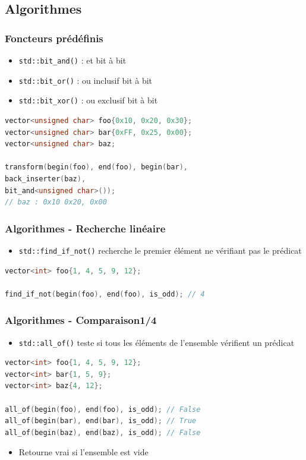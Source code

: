 \documentclass[C++.tex]{subfiles}
\begin{document}
\subsection*{Algorithmes}
\begin{frame}[fragile]
	\frametitle{Foncteurs prédéfinis}
	\begin{itemize}
		\item \lstinline|std::bit_and()| : et bit à bit
		\item \lstinline|std::bit_or()| : ou inclusif bit à bit
		\item \lstinline|std::bit_xor()| : ou exclusif bit à bit
	\end{itemize}

	\begin{lstlisting}[language=C++]
vector<unsigned char> foo{0x10, 0x20, 0x30};
vector<unsigned char> bar{0xFF, 0x25, 0x00};
vector<unsigned char> baz;

transform(begin(foo), end(foo), begin(bar), 
back_inserter(baz), 
bit_and<unsigned char>());
// baz : 0x10 0x20, 0x00\end{lstlisting}
\end{frame}

\begin{frame}[fragile]
	\frametitle{Algorithmes - Recherche linéaire}
	\begin{itemize}
		\item \lstinline|std::find_if_not()| recherche le premier élément ne vérifiant pas le prédicat
	\end{itemize}

	\begin{lstlisting}[language=C++]
vector<int> foo{1, 4, 5, 9, 12};

find_if_not(begin(foo), end(foo), is_odd); // 4\end{lstlisting}

\end{frame}

\begin{frame}[fragile]
	\frametitle{Algorithmes - Comparaison\titlehfill{}1/4}
	\begin{itemize}
		\item \lstinline|std::all_of()| teste si tous les éléments de l'ensemble vérifient un prédicat
	\end{itemize}

	\begin{lstlisting}[language=C++]
vector<int> foo{1, 4, 5, 9, 12};
vector<int> bar{1, 5, 9};
vector<int> baz{4, 12};

all_of(begin(foo), end(foo), is_odd); // False
all_of(begin(bar), end(bar), is_odd); // True
all_of(begin(baz), end(baz), is_odd); // False\end{lstlisting}

	\begin{itemize}
		\item Retourne vrai si l'ensemble est vide
	\end{itemize}
\end{frame}
\end{document}
